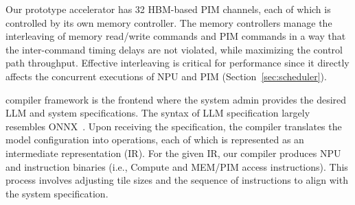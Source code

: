 %
Our prototype \neupims accelerator has 32 HBM-based PIM channels, each of which is controlled by its own memory controller. 
%
The memory controllers manage the interleaving of memory read/write commands and PIM commands in a way that the inter-command timing delays are not violated, while maximizing the control path throughput. 
%
Effective interleaving is critical for performance since it directly affects the concurrent executions of NPU and PIM (Section~\ref{sec:scheduler}). 
%


%
\neupims compiler framework is the frontend where the system admin provides the desired LLM and system specifications. 
%
The syntax of LLM specification largely resembles ONNX~\cite{onnx}. 
%
Upon receiving the specification, the compiler translates the model configuration into operations, each of which is represented as an intermediate representation (IR).
%
For the given IR, our compiler produces NPU and \neupims instruction binaries (i.e., Compute and MEM/PIM access instructions).
%
This process involves adjusting tile sizes and the sequence of instructions to align with the \neupims system specification.
%

